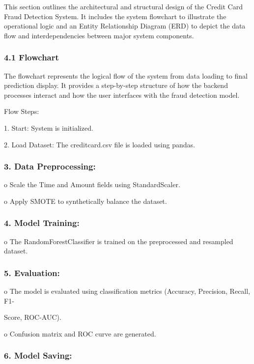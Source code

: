 \documentclass[11pt,a4paper]{article}
\begin{document}
This section outlines the architectural and structural design of the Credit Card Fraud Detection 
System. It includes the system flowchart to illustrate the operational logic and an Entity 
Relationship Diagram (ERD) to depict the data flow and interdependencies between major system 
components. 

\subsubsection*{4.1 Flowchart }

The flowchart represents the logical flow of the system from data loading to final prediction 
display. It provides a step-by-step structure of how the backend processes interact and how the user 
interfaces with the fraud detection model. 

Flow Steps: 

1. Start: System is initialized. 

2. Load Dataset: The creditcard.csv file is loaded using pandas. 

\subsubsection*{3. Data Preprocessing: }

o Scale the Time and Amount fields using StandardScaler. 

o Apply SMOTE to synthetically balance the dataset. 

\subsubsection*{4. Model Training: }

o The RandomForestClassifier is trained on the preprocessed and resampled dataset. 

\subsubsection*{5. Evaluation: }

o The model is evaluated using classification metrics (Accuracy, Precision, Recall, F1-

Score, ROC-AUC). 

o Confusion matrix and ROC curve are generated. 

\subsubsection*{6. Model Saving: }
\end{document}
